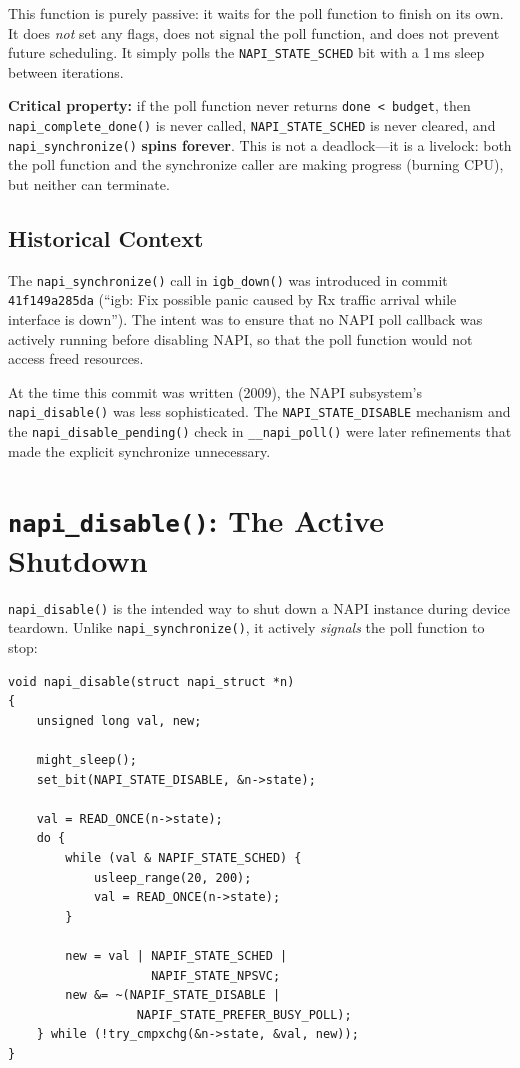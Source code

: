 \documentclass[11pt,a4paper,openany]{book}
\newcommand{\func}[1]{\texttt{#1()}}
\newcommand{\flag}[1]{\texttt{#1}}
\begin{document}
This function is purely passive: it waits for the poll function to
finish on its own.  It does \emph{not} set any flags, does not signal
the poll function, and does not prevent future scheduling.  It simply
polls the \flag{NAPI\_STATE\_SCHED} bit with a 1\,ms sleep between
iterations.

\textbf{Critical property:} if the poll function never returns
\texttt{done < budget}, then \func{napi\_complete\_done} is never called,
\flag{NAPI\_STATE\_SCHED} is never cleared, and
\func{napi\_synchronize} \textbf{spins forever}.  This is not a
deadlock---it is a livelock: both the poll function and the synchronize
caller are making progress (burning CPU), but neither can terminate.

\subsection{Historical Context}

The \func{napi\_synchronize} call in \func{igb\_down} was introduced in
commit \texttt{41f149a285da} (``igb: Fix possible panic caused by Rx
traffic arrival while interface is down'').  The intent was to ensure
that no NAPI poll callback was actively running before disabling NAPI,
so that the poll function would not access freed resources.

At the time this commit was written (2009), the NAPI subsystem's
\func{napi\_disable} was less sophisticated.  The
\flag{NAPI\_STATE\_DISABLE} mechanism and the
\func{napi\_disable\_pending} check in \func{\_\_napi\_poll} were
later refinements that made the explicit synchronize unnecessary.

\section{\texttt{napi\_disable()}: The Active Shutdown}
\label{sec:napi-disable}

\func{napi\_disable} is the intended way to shut down a NAPI instance
during device teardown.  Unlike \func{napi\_synchronize}, it actively
\emph{signals} the poll function to stop:

\begin{lstlisting}[caption={\texttt{napi\_disable()} (net/core/dev.c)},
    label=lst:napi-disable]
void napi_disable(struct napi_struct *n)
{
    unsigned long val, new;

    might_sleep();
    set_bit(NAPI_STATE_DISABLE, &n->state);

    val = READ_ONCE(n->state);
    do {
        while (val & NAPIF_STATE_SCHED) {
            usleep_range(20, 200);
            val = READ_ONCE(n->state);
        }

        new = val | NAPIF_STATE_SCHED |
                    NAPIF_STATE_NPSVC;
        new &= ~(NAPIF_STATE_DISABLE |
                  NAPIF_STATE_PREFER_BUSY_POLL);
    } while (!try_cmpxchg(&n->state, &val, new));
}
\end{lstlisting}
\end{document}

